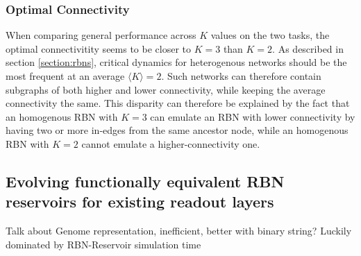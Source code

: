 \subsubsection{Optimal Connectivity}
When comparing general performance across $K$ values on the two tasks,
the optimal connectivitity seems to be closer to $K=3$ than $K=2$.
As described in section \ref{section:rbns},
critical dynamics for heterogenous networks should be the most frequent at an average $\langle K \rangle = 2$.
Such networks can therefore contain subgraphs of both higher and lower connectivity,
while keeping the average connectivity the same.
This disparity can therefore be explained by the fact that an homogenous RBN with $K=3$ can emulate an RBN with lower connectivity by having two or more in-edges from the same ancestor node,
while an homogenous RBN with $K=2$ cannot emulate a higher-connectivity one.


\subsection{Evolving functionally equivalent RBN reservoirs for existing readout layers}

Talk about Genome representation, inefficient, better with binary string?
Luckily dominated by RBN-Reservoir simulation time
